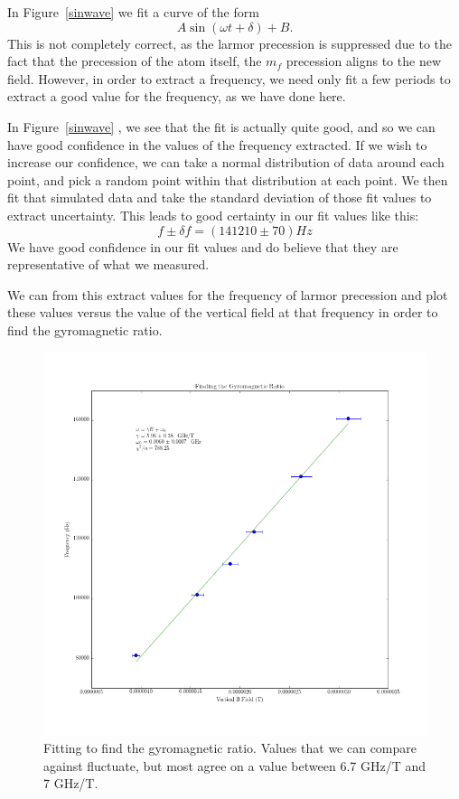 \documentclass{article}
\begin{document}
    In Figure~\ref{sinwave} we fit a curve of the form
    \begin{equation*}
      A\sin(\omega t + \delta) + B.
    \end{equation*}
    This is not completely correct, as the larmor precession is suppressed due to the fact that the precession of the atom itself, the $m_f$ precession aligns to the new field.  However, in order to extract a frequency, we need only fit a few periods to extract a good value for the frequency, as we have done here.

    \hspace{.25cm}

    In Figure~\ref{sinwave} , we see that the fit is actually quite good, and so we can have good confidence in the values of the frequency extracted.  If we wish to increase our confidence, we can take a normal distribution of data around each point, and pick a random point within that distribution at each point.  We then fit that simulated data and take the standard deviation of those fit values to extract uncertainty.  This leads to good certainty in our fit values like this:
    \begin{equation}
      f \pm \delta f = (141210 \pm 70) Hz
      \label{freq_sample}
    \end{equation}
    We have good confidence in our fit values and do believe that they are representative of what we measured.

    We can from this extract values for the frequency of larmor precession and plot these values versus the value of the vertical field at that frequency in order to find the gyromagnetic ratio.

    \begin{figure}[!htb]
      \centering
      \includegraphics[scale=.5]{../plots/gyromagnetic_ratio_fit.png}
      \caption{Fitting to find the gyromagnetic ratio.  Values that we can compare against fluctuate, but most agree on a value between 6.7 GHz/T and 7 GHz/T.}
      \label{gyromagnetic}
    \end{figure}
\end{document}
